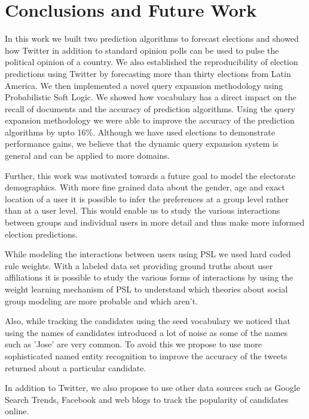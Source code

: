 \chapter{Conclusions and Future Work}
In this work we built two prediction algorithms to forecast elections and showed how Twitter in addition to standard opinion polls can be used to pulse the political opinion of a country.
We also established the reproducibility of election predictions using Twitter by forecasting more than thirty elections from Latin America.
We then implemented a novel query expansion methodology using Probabilistic Soft Logic.
We showed how vocabulary has a direct impact on the recall of documents and the accuracy of prediction algorithms.
Using the query expansion methodology we were able to improve the accuracy of the prediction algorithms by upto 16\%.  
Although we have used elections to demonstrate performance gains, we believe that the dynamic query expansion system is general and can be applied to more domains.

Further, this work was motivated towards a future goal to model the electorate demographics.
With more fine grained data about the gender, age and exact location of a user it is possible to infer the preferences at a group level rather than at a user level.
This would enable us to study the various interactions between groups and individual users in more detail and thus make more informed election predictions.

While modeling the interactions between users using PSL we used hard coded rule weights. 
With a labeled data set providing ground truths about user affiliations it is possible to study the various forms of interactions by using the weight learning mechanism of PSL to understand which theories about social group modeling are more probable and which aren't.

Also, while tracking the candidates using the seed vocabulary we noticed that using the names of candidates introduced a lot of noise as some of the names such as 'Jose' are very common. 
To avoid this we propose to use more sophisticated named entity recognition to improve the accuracy of the tweets returned about a particular candidate. 

In addition to Twitter, we also propose to use other data sources such as Google Search Trends, Facebook and web blogs to track the popularity of candidates online.